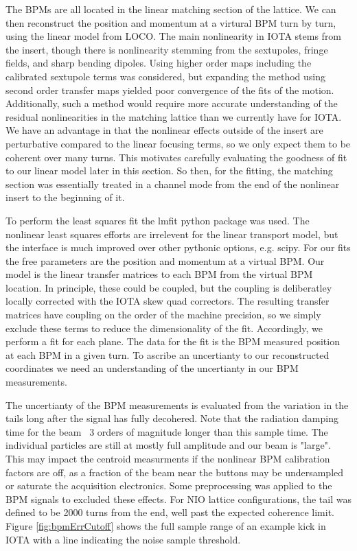 The BPMs are all located in the linear matching section of the lattice. We can then reconstruct the position and momentum at a virtural BPM turn by turn, using the linear model from LOCO. The main nonlinearity in IOTA stems from the insert, though there is nonlinearity stemming from the sextupoles, fringe fields, and sharp bending dipoles. Using higher order maps including the calibrated sextupole terms was considered, but expanding the method using second order transfer maps yielded poor convergence of the fits of the motion. Additionally, such a method would require more accurate understanding of the residual nonlinearities in the matching lattice than we currently have for IOTA. We have an advantage in that the nonlinear effects outside of the insert are perturbative compared to the linear focusing terms, so we only expect them to be coherent over many turns. This motivates carefully evaluating the goodness of fit to our linear model later in this section. So then, for the fitting, the matching section was essentially treated in a channel mode from the end of the nonlinear insert to the beginning of it.

To perform the least squares fit the lmfit python package \cite{newvilleLMFIT} was used. The nonlinear least squares efforts are irrelevent for the linear transport model, but the interface is much improved over other pythonic options, e.g. scipy. For our fits the free parameters are the position and momentum at a virtual BPM. Our model is the linear transfer matrices to each BPM from the virtual BPM location. In principle, these could be coupled, but the coupling is deliberatley locally corrected with the IOTA skew quad correctors. The resulting transfer matrices have coupling on the order of the machine precision, so we simply exclude these terms to reduce the dimensionality of the fit. Accordingly, we perform a fit for each plane. The data for the fit is the BPM measured position at each BPM in a given turn. To ascribe an uncertianty to our reconstructed coordinates we need an understanding of the uncertianty in our BPM measurements.

The uncertianty of the BPM measurements is evaluated from the variation in the tails long after the signal has fully decohered. Note that the radiation damping time for the beam ~3 orders of magnitude longer than this sample time. The individual particles are still at mostly full amplitude and our beam is "large". This may impact the centroid measurments if the nonlinear BPM calibration factors are off, as a fraction of the beam near the buttons may be undersampled or saturate the acquisition electronics. Some preprocessing was applied to the BPM signals to excluded these effects. For NIO lattice configurations, the tail was defined to be 2000 turns from the end, well past the expected coherence limit. Figure \ref{fig:bpmErrCutoff} shows the full sample range of an example kick in IOTA with a line indicating the noise sample threshold.


